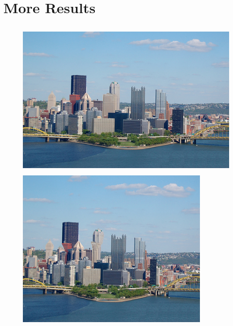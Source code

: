
\section{More Results}
\begin{figure}[H]
\includegraphics[height=8cm]{src/sea.jpg}\\
\includegraphics[height=8cm]{result/sea2.png}
\centering
\end{figure}

